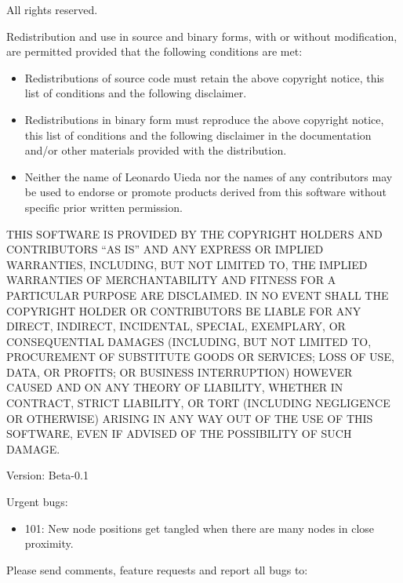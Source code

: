 \documentclass[a4paper,12pt,english]{sphinxmanual}
\begin{document}
All rights reserved.

Redistribution and use in source and binary forms, with or without modification,
are permitted provided that the following conditions are met:
\begin{itemize}
\item {} 
Redistributions of source code must retain the above copyright notice,
this list of conditions and the following disclaimer.

\item {} 
Redistributions in binary form must reproduce the above copyright notice,
this list of conditions and the following disclaimer in the documentation
and/or other materials provided with the distribution.

\item {} 
Neither the name of Leonardo Uieda nor the names of any contributors
may be used to endorse or promote products derived from this software
without specific prior written permission.

\end{itemize}

THIS SOFTWARE IS PROVIDED BY THE COPYRIGHT HOLDERS AND CONTRIBUTORS “AS IS” AND
ANY EXPRESS OR IMPLIED WARRANTIES, INCLUDING, BUT NOT LIMITED TO, THE IMPLIED
WARRANTIES OF MERCHANTABILITY AND FITNESS FOR A PARTICULAR PURPOSE ARE
DISCLAIMED. IN NO EVENT SHALL THE COPYRIGHT HOLDER OR CONTRIBUTORS BE LIABLE FOR
ANY DIRECT, INDIRECT, INCIDENTAL, SPECIAL, EXEMPLARY, OR CONSEQUENTIAL DAMAGES
(INCLUDING, BUT NOT LIMITED TO, PROCUREMENT OF SUBSTITUTE GOODS OR SERVICES;
LOSS OF USE, DATA, OR PROFITS; OR BUSINESS INTERRUPTION) HOWEVER CAUSED AND ON
ANY THEORY OF LIABILITY, WHETHER IN CONTRACT, STRICT LIABILITY, OR TORT
(INCLUDING NEGLIGENCE OR OTHERWISE) ARISING IN ANY WAY OUT OF THE USE OF THIS
SOFTWARE, EVEN IF ADVISED OF THE POSSIBILITY OF SUCH DAMAGE.



Version: Beta-0.1

Urgent bugs:
\begin{itemize}
\item {} 
101: New node positions get tangled when there are many nodes in close proximity.

\end{itemize}

Please send comments, feature requests and report all bugs to: 



\renewcommand{\indexname}{Index}
\printindex
\end{document}
